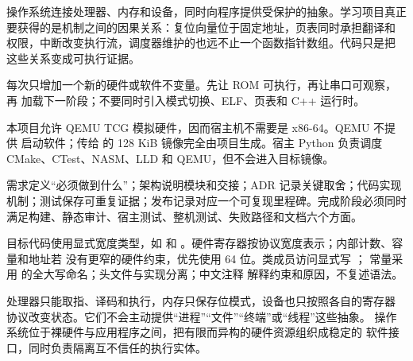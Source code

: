 
操作系统连接处理器、内存和设备，同时向程序提供受保护的抽象。学习项目真正
要获得的是机制之间的因果关系：复位向量位于固定地址，页表同时承担翻译和
权限，中断改变执行流，调度器维护的也远不止一个函数指针数组。代码只是把
这些关系变成可执行证据。

每次只增加一个新的硬件或软件不变量。先让 ROM 可执行，再让串口可观察，再
加载下一阶段；不要同时引入模式切换、ELF、页表和 C++ 运行时。

本项目允许 QEMU TCG 模拟硬件，因而宿主机不需要是 x86-64。QEMU 不提供
启动软件；传给  的 128 KiB 镜像完全由项目生成。宿主 Python
负责调度 CMake、CTest、NASM、LLD 和 QEMU，但不会进入目标镜像。

\begin{center}
\end{center}

需求定义“必须做到什么”；架构说明模块和交接；ADR 记录关键取舍；代码实现
机制；测试保存可重复证据；发布记录对应一个可复现里程碑。完成阶段必须同时
满足构建、静态审计、宿主测试、整机测试、失败路径和文档六个方面。

目标代码使用显式宽度类型，如  和
。硬件寄存器按协议宽度表示；内部计数、容量和地址若
没有更窄的硬件约束，优先使用 64 位。类成员访问显式写 ；
常量采用  的全大写命名；头文件与实现分离；中文注释
解释约束和原因，不复述语法。

处理器只能取指、译码和执行，内存只保存位模式，设备也只按照各自的寄存器
协议改变状态。它们不会主动提供“进程”“文件”“终端”或“线程”这些抽象。
操作系统位于裸硬件与应用程序之间，把有限而异构的硬件资源组织成稳定的
软件接口，同时负责隔离互不信任的执行实体。

